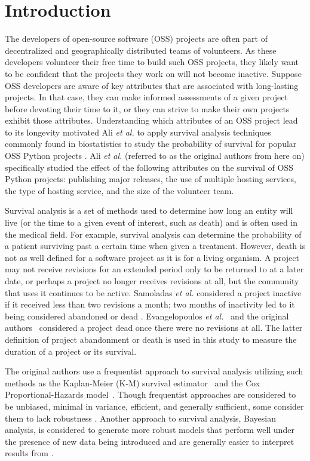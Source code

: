 \documentclass[sigconf,review]{acmart}
\begin{document}
\section{Introduction} \label{intro}

The developers of open-source software (OSS) projects are often part of decentralized and geographically distributed teams of volunteers.
As these developers volunteer their free time to build such OSS projects, they likely want to be confident that the projects they work on will not become inactive.
Suppose OSS developers are aware of key attributes that are associated with long-lasting projects.
In that case, they can make informed assessments of a given project before devoting their time to it, or they can strive to make their own projects exhibit those attributes.
Understanding which attributes of an OSS project lead to its longevity motivated Ali \emph{et al.} to apply survival analysis techniques commonly found in biostatistics to study the probability of survival for popular OSS Python projects \cite{ali2020cheating}.
Ali \emph{et al.} (referred to as the original authors from here on) specifically studied the effect of the following attributes on the survival of OSS Python projects: publishing major releases, the use of multiple hosting services, the type of hosting service, and the size of the volunteer team.

Survival analysis is a set of methods used to determine how long an entity will live (or the time to a given event of interest, such as death) and is often used in the medical field.
For example, survival analysis can determine the probability of a patient surviving past a certain time when given a treatment.
However, death is not as well defined for a software project as it is for a living organism.
A project may not receive revisions for an extended period only to be returned to at a later date, or perhaps a project no longer receives revisions at all, but the community that uses it continues to be active.
Samoladas \emph{et al.} considered a project inactive if it received less than two revisions a month; two months of inactivity led to it being considered abandoned or dead \cite{samoladas2010survival}.
Evangelopoulos \emph{et al.}~\cite{evangelopoulos} and the original authors~\cite{ali2020cheating} considered a project dead once there were no revisions at all.
The latter definition of project abandonment or death is used in this study to measure the duration of a project or its survival.

The original authors use a frequentist approach to survival analysis utilizing such methods as the Kaplan-Meier (K-M) survival estimator~\cite{kaplan1958nonparametric} and the Cox Proportional-Hazards model~\cite{cox1972regression}.
Though frequentist approaches are considered to be unbiased, minimal in variance, efficient, and generally sufficient, some consider them to lack robustness \cite{renganathan2016overview}. Another approach to survival analysis, Bayesian analysis, is considered to generate more robust models that perform well under the presence of new data being introduced and are generally easier to interpret results from \cite{renganathan2016overview}.
\end{document}
